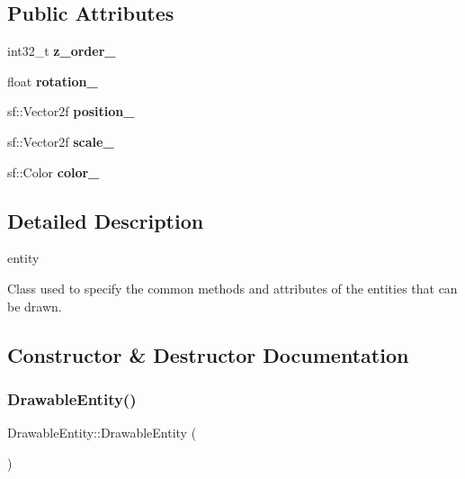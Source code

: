 \subsection*{Public Attributes}
\begin{DoxyCompactItemize}
\item 
\mbox{\label{class_drawable_entity_a7edd7e234484ae696a2820f186109929}} 
int32\+\_\+t {\bfseries z\+\_\+order\+\_\+}
\item 
\mbox{\label{class_drawable_entity_a883df88517413496ba69558f5f32623c}} 
float {\bfseries rotation\+\_\+}
\item 
\mbox{\label{class_drawable_entity_abcda108a72f5c59464f65cbd8c405410}} 
sf\+::\+Vector2f {\bfseries position\+\_\+}
\item 
\mbox{\label{class_drawable_entity_a834104b0d2cddb9d03bffbf251547d90}} 
sf\+::\+Vector2f {\bfseries scale\+\_\+}
\item 
\mbox{\label{class_drawable_entity_ad424f3d5b9ddbc6c556fbc64642e9153}} 
sf\+::\+Color {\bfseries color\+\_\+}
\end{DoxyCompactItemize}


\subsection{Detailed Description}
entity

Class used to specify the common methods and attributes of the entities that can be drawn. 

\subsection{Constructor \& Destructor Documentation}
\mbox{\label{class_drawable_entity_a8e9f9afa7c76fdc19e27ca0975ffcb21}} 
\subsubsection{\texorpdfstring{Drawable\+Entity()}{DrawableEntity()}}
{\footnotesize\ttfamily Drawable\+Entity\+::\+Drawable\+Entity (\begin{DoxyParamCaption}{ }\end{DoxyParamCaption})}

